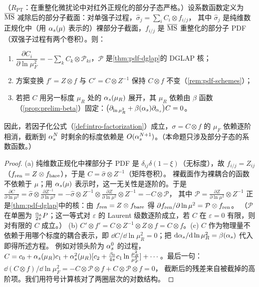 \begin{proposition}\label{prop:method-scale-scheme}
（$R_{\mathrm{PT}}$：在重整化微扰论中对红外正规化的部分子态严格。）设系数函数定义为 $\overline{\rm MS}$ 减除后的部分子截面：对单强子过程，$\hat\sigma_j=\sum_iC_i\otimes f_{i/j}$，
其中 $\hat\sigma_j$ 是纯维数正规化中（用 $\alpha_s(\mu)$ 表示的）裸部分子截面，$f_{i/j}$ 是 $\overline{\rm MS}$ 重整化的部分子 PDF（双强子过程有两个卷积）。则：
\begin{enumerate}[label=(\alph*),leftmargin=2em,itemsep=1pt,topsep=2pt]
\item $\dfrac{\partial C_i}{\partial\ln\mu_F^2}=-\sum_kC_k\otimes\mathcal P_{ki}$，$\mathcal P$ 是\cref{thm:pdf-dglap}的 DGLAP 核；
\item 方案变换 $f'=Z\otimes f$ 与 $C'=C\otimes Z^{-1}$ 保持 $C\otimes f$ 不变（\cref{rem:pdf-schemes}）；
\item 若把 $C$ 用另一标度 $\mu_R$ 处的 $\alpha_s(\mu_R)$ 展开，其 $\mu_R$ 依赖由 $\beta$ 函数（\cref{prop:prelim-beta}）固定：$\bigl(\partial_{\ln\mu_R^2}+\beta(\alpha_s)\partial_{\alpha_s}\bigr)C=0$。
\end{enumerate}
因此，若因子化公式（\cref{def:intro-factorization}）成立，$\sigma=C\otimes f$ 的 $\mu_F$ 依赖逐阶相消，截断到 $\alpha_s^N$ 时剩余的标度依赖是 $O(\alpha_s^{N+1})$。（本命题只涉及部分子态的系数函数。）
\end{proposition}

\begin{proof}
(a) 纯维数正规化中裸部分子 PDF 是 $\delta_{ij}\delta(1-\xi)$（无标度），故 $f_{i/j}=Z_{ij}$（$f_{\rm ren}=Z\otimes f_{\rm bare}$），于是 $C=\hat\sigma\otimes Z^{-1}$（矩阵卷积）。
裸截面作为裸耦合的函数不依赖于 $\mu$；用 $\alpha_s(\mu)$ 表示时，这一无关性是逐阶的。于是
$\frac{\partial C}{\partial\ln\mu^2}=\hat\sigma\otimes\frac{\partial Z^{-1}}{\partial\ln\mu^2}=-\hat\sigma\otimes Z^{-1}\otimes\frac{\partial Z}{\partial\ln\mu^2}\otimes Z^{-1}=-C\otimes\mathcal P$，
其中 $\mathcal P=\frac{\partial Z}{\partial\ln\mu^2}\otimes Z^{-1}$ 正是\cref{thm:pdf-dglap}中的核：由 $f_{\rm ren}=Z\otimes f_{\rm bare}$ 得 $\partial f_{\rm ren}/\partial\ln\mu^2=\mathcal P\otimes f_{\rm ren}$。
（$\mathcal P$ 在单圈为 $\frac{\alpha_s}{2\pi}P$；这一等式对 $\varepsilon$ 的 Laurent 级数逐阶成立，若 $C$ 在 $\varepsilon=0$ 有限，则对有限的 $C$ 成立。）
(b) $C'\otimes f'=C\otimes Z^{-1}\otimes Z\otimes f=C\otimes f$。(c) $C$ 作为物理量不依赖于用哪个标度的耦合表示，即 $\dd C/\dd\ln\mu_R^2=0$；把 $\mathrm{d}\alpha_s/\mathrm{d}\ln\mu_R^2=\beta(\alpha_s)$ 代入即得所述方程。
例如对领头阶为 $\alpha_s^0$ 的过程，$C=c_0+\alpha_s(\mu_R)c_1+\alpha_s^2(\mu_R)[c_2+\frac{\beta_0}{4\pi}c_1\ln\frac{\mu_R^2}{\mu_F^2}]+\cdots$。最后一句：$\dd(C\otimes f)/\dd\ln\mu_F^2=-C\otimes\mathcal P\otimes f+C\otimes\mathcal P\otimes f=0$，
截断后的残差来自被截掉的高阶项。我们用符号计算核对了两圈层次的对数结构。%
\end{proof}

